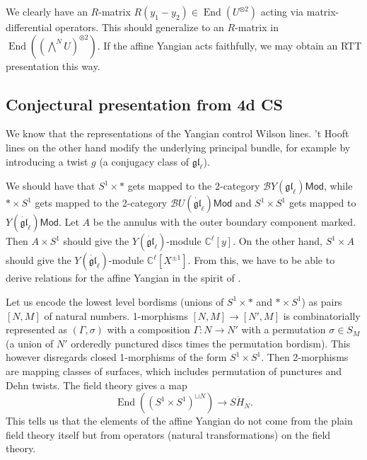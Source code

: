 \documentclass[11pt]{report}
\theoremstyle{definition}
\theoremstyle{remark}
\theoremstyle{remark}
\newcommand{\End}{\operatorname{End}}
\newcommand{\C}{\mathbb{C}}
\begin{document}
We clearly have an $R$-matrix $R(y_1-y_2) \in \End(U^{\otimes 2})$ acting via matrix-differential operators. This should generalize to an $R$-matrix in $\End((\bigwedge^N U)^{\otimes 2})$. If the affine Yangian acts faithfully, we may obtain an RTT presentation this way.

\subsection{Conjectural presentation from 4d CS}

We know that the representations of the Yangian control Wilson lines. 't Hooft lines on the other hand modify the underlying principal bundle, for example by introducing a twist $g$ (a conjugacy class of $\mathfrak{gl}_\ell$).

We should have that $S^1 \times *$ gets mapped to the 2-category $\mathcal{B}Y(\mathfrak{gl}_\ell)\mathsf{Mod}$, while $* \times S^1$ gets mapped to the 2-category $\mathcal{B}U(\dot{\mathfrak{gl}}_\ell)\mathsf{Mod}$ and $S^1 \times S^1$ gets mapped to $Y(\dot{\mathfrak{gl}}_\ell)\mathsf{Mod}$. Let $A$ be the annulus with the outer boundary component marked. Then $A \times S^1$ should give the $Y(\dot{\mathfrak{gl}}_\ell)$-module $\C^\ell[y]$. On the other hand, $S^1 \times A$ should give the $Y(\dot{\mathfrak{gl}}_\ell)$-module $\C^\ell[X^{\pm 1}]$. From this, we have to be able to derive relations for the affine Yangian in the spirit of \cite{article:costello:2018b}.

Let us encode the lowest level bordisms (unions of $S^1 \times *$ and $* \times S^1$) as pairs $[N,M]$ of natural numbers. 1-morphisms $[N,M] \to [N',M]$ is combinatorially represented as $(\Gamma,\sigma)$ with a composition $\Gamma: N \to N'$ with a permutation $\sigma \in S_M$ (a union of $N'$ orderedly punctured discs times the permutation bordism). This however disregards closed 1-morphisms of the form $S^1 \times S^1$. Then 2-morphisms are mapping classes of surfaces, which includes permutation of punctures and Dehn twists. The field theory gives a map
\begin{equation*}
\End((S^1 \times S^1)^{\sqcup N}) \to S \ddot H_N.
\end{equation*}
This tells us that the elements of the affine Yangian do not come from the plain field theory itself but from operators (natural transformations) on the field theory.
\end{document}
